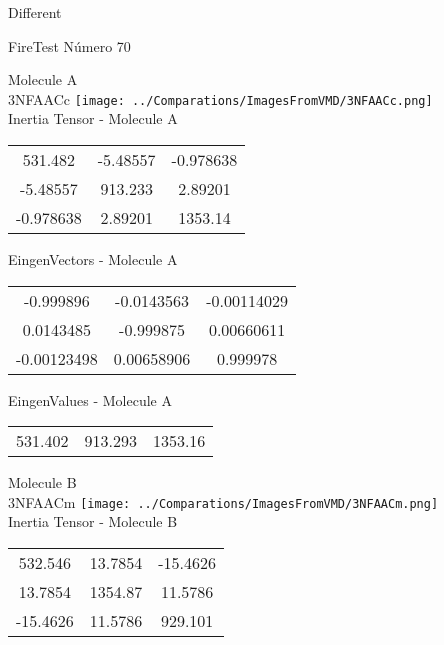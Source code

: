 \begin{center}
\vtab
\vtab
\textcolor{NavyBlue}{\Large Different}
\end{center}

 \newpage

\vtab[-2cm]
\begin{center}
{\large FireTest \tab Número 70}
\end{center}
\begin{multicols}{2}
\begin{center}

Molecule A \\ 
3NFAACc
\texttt{[image: ../Comparations/ImagesFromVMD/3NFAACc.png]}
\\
Inertia Tensor - Molecule A \\
\vtab

\begin{tabular}{|c c c|}
531.482	 & 	-5.48557	 & 	-0.978638	 \\
-5.48557	 & 	913.233	 & 	2.89201	 \\
-0.978638	 & 	2.89201	 & 	1353.14
\end{tabular}

\vtab
 EingenVectors - Molecule A     \\
\vtab
\begin{tabular}{|c c c|}
-0.999896	 & 	-0.0143563	 & 	-0.00114029	 \\
0.0143485	 & 	-0.999875	 & 	0.00660611	 \\
-0.00123498	 & 	0.00658906	 & 	0.999978
\end{tabular}

\vtab
 EingenValues - Molecule A     \\
\vtab
\begin{tabular}{|c c c|}
531.402	 & 	913.293	 & 	1353.16	 \\
\end{tabular}
\columnbreak

Molecule B \\ 
3NFAACm
\texttt{[image: ../Comparations/ImagesFromVMD/3NFAACm.png]}
\\
Inertia Tensor - Molecule B \\
\vtab

\begin{tabular}{|c c c|}
532.546	 & 	13.7854	 & 	-15.4626	 \\
13.7854	 & 	1354.87	 & 	11.5786	 \\
-15.4626	 & 	11.5786	 & 	929.101
\end{tabular}


\end{center}
\end{multicols}

